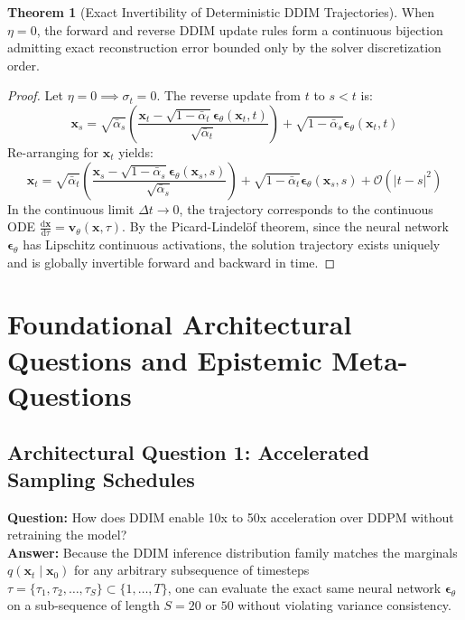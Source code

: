 \documentclass[11pt,a4paper]{article}
\theoremstyle{definition}
\newtheorem{theorem}{\textbf{Theorem}}[section]
\begin{document}
\begin{theorem}[Exact Invertibility of Deterministic DDIM Trajectories]
When $\eta = 0$, the forward and reverse DDIM update rules form a continuous bijection admitting exact reconstruction error bounded only by the solver discretization order.
\end{theorem}

\begin{proof}
Let $\eta = 0 \implies \sigma_t = 0$. The reverse update from $t$ to $s < t$ is:
{\boldmath
\begin{equation}
\mathbf{x}_s = \sqrt{\bar{\alpha}_s} \left( \frac{\mathbf{x}_t - \sqrt{1 - \bar{\alpha}_t}\boldsymbol{\epsilon}_\theta(\mathbf{x}_t, t)}{\sqrt{\bar{\alpha}_t}} \right) + \sqrt{1 - \bar{\alpha}_s} \boldsymbol{\epsilon}_\theta(\mathbf{x}_t, t)
\end{equation}
}
Re-arranging for $\mathbf{x}_t$ yields:
{\boldmath
\begin{equation}
\mathbf{x}_t = \sqrt{\bar{\alpha}_t} \left( \frac{\mathbf{x}_s - \sqrt{1 - \bar{\alpha}_s}\boldsymbol{\epsilon}_\theta(\mathbf{x}_s, s)}{\sqrt{\bar{\alpha}_s}} \right) + \sqrt{1 - \bar{\alpha}_t}\boldsymbol{\epsilon}_\theta(\mathbf{x}_s, s) + \mathcal{O}(|t - s|^2)
\end{equation}
}
In the continuous limit $\Delta t \to 0$, the trajectory corresponds to the continuous ODE $\frac{\mathrm{d}\mathbf{x}}{\mathrm{d}\tau} = \mathbf{v}_\theta(\mathbf{x}, \tau)$. By the Picard-Lindel\"of theorem, since the neural network $\boldsymbol{\epsilon}_\theta$ has Lipschitz continuous activations, the solution trajectory exists uniquely and is globally invertible forward and backward in time.
\end{proof}

\section{Foundational Architectural Questions and Epistemic Meta-Questions}

\subsection{Architectural Question 1: Accelerated Sampling Schedules}
\textbf{Question:} How does DDIM enable 10x to 50x acceleration over DDPM without retraining the model?\\
\textbf{Answer:} Because the DDIM inference distribution family matches the marginals $q(\mathbf{x}_t \mid \mathbf{x}_0)$ for any arbitrary subsequence of timesteps $\tau = \{\tau_1, \tau_2, \dots, \tau_S\} \subset \{1, \dots, T\}$, one can evaluate the exact same neural network $\boldsymbol{\epsilon}_\theta$ on a sub-sequence of length $S = 20$ or $50$ without violating variance consistency.
\end{document}
